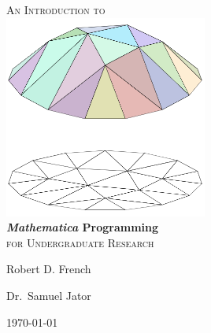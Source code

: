 \begin{titlepage}
\begin{center}
\textsc{\LARGE An Introduction to}\\[1.5cm]
\includegraphics[width=0.5\textwidth]{figures/CustomCover/500px-Piecewise_linear_function2D.png}\\[1cm]    
{ \huge \bfseries \emph{Mathematica} Programming}\\[0.4cm]
\textsc{\Large for Undergraduate Research}\\[0.5cm]
\begin{minipage}{0.4\textwidth}
\begin{flushleft} \large
Robert D. French
\end{flushleft}
\end{minipage}
\begin{minipage}{0.4\textwidth}
\begin{flushright} \large
Dr.~Samuel Jator
\end{flushright}
\end{minipage}
\vfill
{\large \today}
\end{center}
\end{titlepage}
